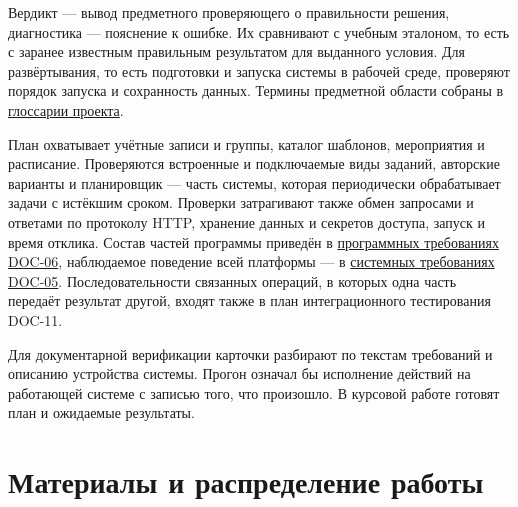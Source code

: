 \documentclass[12pt,a4paper]{article}
\begin{document}
Вердикт --- вывод предметного проверяющего о правильности решения, диагностика --- пояснение к ошибке. Их сравнивают с учебным эталоном, то есть с заранее известным правильным результатом для выданного условия. Для развёртывания, то есть подготовки и запуска системы в рабочей среде, проверяют порядок запуска и сохранность данных. Термины предметной области собраны в {\href{../02\_Общие\_соглашения/Глоссарий.pdf\#глоссарий}{глоссарии проекта}}.

План охватывает учётные записи и группы, каталог шаблонов, мероприятия и расписание. Проверяются встроенные и подключаемые виды заданий, авторские варианты и планировщик --- часть системы, которая периодически обрабатывает задачи с истёкшим сроком. Проверки затрагивают также обмен запросами и ответами по протоколу HTTP, хранение данных и секретов доступа, запуск и время отклика. Состав частей программы приведён в {\href{../07\_Программные\_требования/DOC-06\_Программные\_требования.pdf\#doc-06-сводные-программные-требования}{программных требованиях DOC-06}}, наблюдаемое поведение всей платформы --- в {\href{../04\_Системные\_требования/DOC-05\_Системные\_требования.pdf\#doc-05-системные-требования}{системных требованиях DOC-05}}. Последовательности связанных операций, в которых одна часть передаёт результат другой, входят также в план интеграционного тестирования DOC-11.

Для документарной верификации карточки разбирают по текстам требований и описанию устройства системы. Прогон означал бы исполнение действий на работающей системе с записью того, что произошло. В курсовой работе готовят план и ожидаемые результаты.

\section{Материалы и распределение работы}\label{ux43cux430ux442ux435ux440ux438ux430ux43bux44b-ux438-ux440ux430ux441ux43fux440ux435ux434ux435ux43bux435ux43dux438ux435-ux440ux430ux431ux43eux442ux44b}

\hypertarget{материалы-и-распределение-работы}{}
\end{document}
